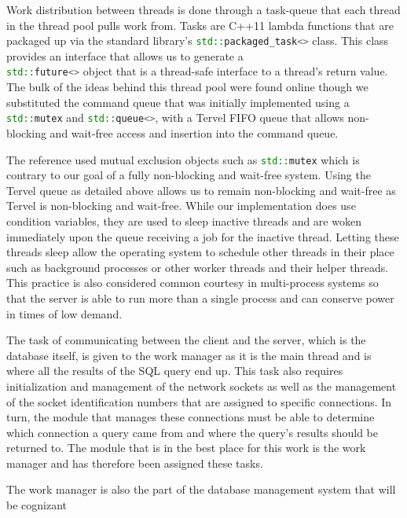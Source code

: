 \documentclass[letterpaper, 11pt]{article}
\newcommand{\inlinecode}[1]{\colorbox{codegrey}{\lstinline[language=C++]{#1}}}
\begin{document}
Work distribution between threads is done through a task-queue that each thread in the
thread pool pulls work from. Tasks are C++11 lambda functions that are packaged up
via the standard library's \inlinecode{std::packaged_task<>} class.
This class provides an interface that allows us to generate a \\ \inlinecode{std::future<>}
object that is a thread-safe interface to a thread's return value. The bulk of the
ideas behind this thread pool were found online \cite{stackoverflow1} though we substituted
the command queue that was initially implemented using a \inlinecode{std::mutex}
and \inlinecode{std::queue<>}, with a Tervel FIFO queue that allows
non-blocking and wait-free access and insertion into the command queue.
\par\vspace{\baselineskip}
The reference used mutual exclusion objects such as \inlinecode{std::mutex}
which is contrary to our goal of a fully non-blocking and wait-free system. Using the Tervel
queue as detailed above allows us to remain non-blocking and wait-free as Tervel
is non-blocking and wait-free. While our implementation does use condition variables,
they are used to sleep inactive threads and are woken immediately upon the queue receiving 
a job for the inactive thread. Letting these threads sleep allow the operating system to 
schedule other threads in their place such as background processes or other worker threads 
and their helper threads. This practice is also considered common courtesy in multi-process 
systems so that the server is able to run more than a single process and can conserve power 
in times of low demand.
\par\vspace{\baselineskip}
The task of communicating between the client and the server, which is the database itself,
is given to the work manager as it is the main thread and is where all the results of
the SQL query end up. This task also requires initialization and management of the network
sockets as well as the management of the socket identification numbers that are assigned
to specific connections. In turn, the module that manages these connections must be able to
determine which connection a query came from and where the query's results should be
returned to. The module that is in the best place for this work is the work manager
and has therefore been assigned these tasks.
\par\vspace{\baselineskip}
The work manager is also the part of the database management system that will be cognizant
\end{document}

